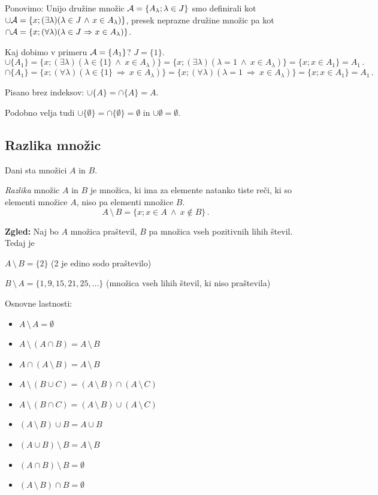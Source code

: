 \documentclass[11pt,paper=b5,footinclude,headinclude]{scrbook} %
\def\inn {{~\wedge~}}
\def\sledi {{~\Rightarrow~}}
\def\brez {{\,\setminus\,}}
\begin{document}
Ponovimo: Unijo družine množic ${\cal A} = \{A_\lambda; \lambda \in J\}$ smo definirali kot\\
$\cup {\cal A} = \{x;(\exists \lambda) (\lambda \in J\inn x\in A_\lambda)\}$, presek neprazne družine množic pa kot \\
\hbox{$\cap {\cal A} = \{x;(\forall \lambda) (\lambda \in J\sledi x\in A_\lambda)\}$.}

Kaj dobimo v primeru ${\cal A} = \{A_1\}$? $J= \{1\}$.
$$\cup \{A_1\}
= \{x;(\exists \lambda) (\lambda \in \{1\}\inn x\in A_\lambda)\}
= \{x;(\exists \lambda) (\lambda = 1 \inn x\in A_\lambda)\}
 = \{x;x\in A_1\} = A_1\,.$$
$$\cap \{A_1\} =
\{x;(\forall \lambda) (\lambda \in \{1\}\sledi x\in A_\lambda)\}
= \{x;(\forall \lambda)(\lambda= 1\sledi x\in A_\lambda)\}
 = \{x;x\in A_1\} = A_1\,.$$

Pisano brez indeksov: $\cup \{A\} = \cap \{A\} = A$.

Podobno velja tudi $\cup \{\emptyset\} = \cap \{\emptyset\} = \emptyset$ in $\cup \emptyset = \emptyset$.


\subsection{Razlika množic}

Dani sta množici $A$ in $B$.

{\em Razlika} množic $A$ in $B$ je množica, ki ima za elemente natanko tiste reči, ki so elementi množice $A$, niso pa elementi množice $B$.
$$A\brez B = \{x; x\in A\inn x\not\in B\}\,.$$

\textbf{ Zgled:}
Naj bo $A$ množica praštevil, $B$ pa množica vseh pozitivnih lihih števil.
Tedaj je

$A\brez B = \{2\}$ (2 je edino sodo praštevilo)

$B\brez A = \{1,9,15,21,25,\ldots\}$ (množica vseh lihih števil, ki niso praštevila)

\bigskip

Osnovne lastnosti:

\begin{itemize}
  \item $A\brez A = \emptyset$

  \item $A\brez (A\cap B) = A\brez B$

  \item $A\cap (A\brez B) = A\brez B$

  \item $A\brez (B\cup C) = (A\brez B)\cap (A\brez C)$

  \item $A\brez (B\cap C) = (A\brez B)\cup (A\brez C)$

  \item $(A\brez B)\cup B = A\cup B$

  \item $(A\cup B)\brez B = A\brez B$

  \item $(A\cap B)\brez B = \emptyset$

  \item $(A\brez B)\cap B = \emptyset$
\end{itemize}
\end{document}
